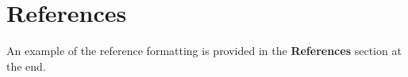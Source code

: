 \documentclass[journal]{vgtc}                     %
\begin{document}
\section{References}
\label{sec:references_inst}

An example of the reference formatting is provided in the \textbf{References} section at the end.




%
%
%




\appendix %
\end{document}
